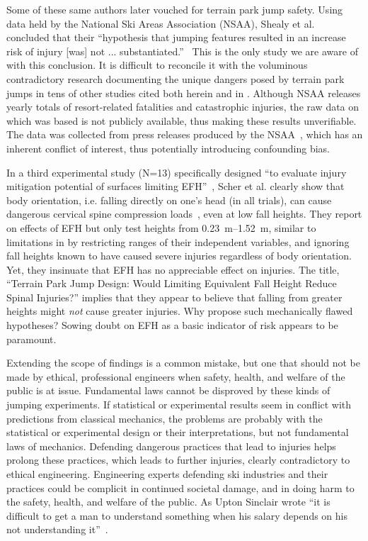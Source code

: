 \documentclass{article}
\begin{document}
Some of these same authors later vouched for terrain park jump safety. Using
data held by the National Ski Areas Association (NSAA), Shealy et
al.~\cite{Shealy2015} concluded that their ``hypothesis that jumping features
resulted in an increase risk of injury [was] not ...
substantiated.''~\cite{Shealy2015} This is the only study we are aware of with
this conclusion. It is difficult to reconcile it with the voluminous
contradictory research documenting the unique dangers posed by terrain park
jumps in tens of other studies cited both herein and in
\cite{Hubbard2009,Swedberg2012,McNeil2012,McNeil2012a,Hubbard2015,Levy2015,Petrone2017,Moore2018}.
Although NSAA releases yearly totals of resort-related fatalities and
catastrophic injuries, the raw data on which \cite{Shealy2015} was based is not 
publicly available, thus making these results unverifiable. The data was collected from press releases produced by
the NSAA~\cite{Shealy2015}, which has an inherent conflict of interest, thus potentially introducing confounding bias.

In a third experimental study (N=13) specifically designed ``to evaluate injury
mitigation potential of surfaces limiting EFH''~\cite{Scher2015}, Scher et al.
clearly show that body orientation, i.e. falling directly on one's head (in all
trials), can cause dangerous cervical spine compression loads~\cite{Scher2015},
even at low fall heights. They report on effects of EFH but only test heights
from \SIrange{0.23}{1.52}{\meter},  similar to limitations in
\cite{Shealy2010} by restricting ranges of their independent variables, and
ignoring fall heights known to have caused severe injuries regardless of body
orientation. Yet, they insinuate that EFH has no appreciable effect on
injuries.  The title, ``Terrain Park Jump Design: Would Limiting Equivalent
Fall Height Reduce Spinal Injuries?'' implies that they appear to believe that
falling from greater heights might \emph{not} cause greater injuries. Why
propose such mechanically flawed hypotheses? Sowing doubt on EFH as a
basic indicator of risk appears to be paramount.

Extending the scope of findings is a common mistake, but one
that should not be made by ethical, professional engineers when safety, health, and welfare of the public is at issue. Fundamental laws cannot be
disproved by these kinds of jumping experiments. If statistical or experimental
results seem in conflict with predictions from classical mechanics, the
problems are probably with the statistical or experimental design or
their interpretations, but not fundamental laws of mechanics. Defending dangerous 
practices that lead to injuries helps prolong these practices, which
leads to further injuries, clearly contradictory to ethical engineering. Engineering experts defending ski industries and their practices could be complicit in continued societal
damage, and in doing harm to the safety, health, and welfare of the public. As Upton Sinclair wrote ``it is difficult to get a man to understand
something when his salary depends on his not understanding
it''~\cite{Sinclair1994}.
\end{document}
